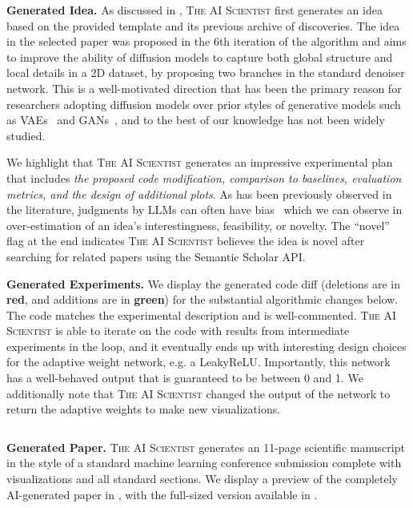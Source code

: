 \documentclass[11pt, a4paper]{include/gdm_format}
\newcommand{\ouralgo}{\textsc{The AI Scientist}\xspace}
\begin{document}
\textbf{Generated Idea.}
As discussed in , \ouralgo first generates an idea based on the provided template and its previous archive of discoveries.
The idea in the selected paper was proposed in the 6th iteration of the algorithm and aims to improve the ability of diffusion models to capture both global structure and local details in a 2D dataset, by proposing two branches in the standard denoiser network.
This is a well-motivated direction that has been the primary reason for researchers adopting diffusion models over prior styles of generative models such as VAEs~\citep{vae} and GANs~\citep{gan}, and to the best of our knowledge has not been widely studied.

We highlight that \ouralgo generates an impressive experimental plan that includes \emph{the proposed code modification, comparison to baselines, evaluation metrics, and the design of additional plots}.
As has been previously observed in the literature, judgments by LLMs can often have bias~\citep{zheng2024judging} which we can observe in over-estimation of an idea's interestingness, feasibility, or novelty.
The ``novel'' flag at the end indicates \ouralgo believes the idea is novel after searching for related papers using the Semantic Scholar API.

\begin{tcolorbox}[breakable,colback=blue!5!white, colframe=blue!75!black, title=Idea - \texttt{adaptive\_dual\_scale\_denoising}]
{\small  }
\end{tcolorbox}

\textbf{Generated Experiments.}
We display the generated code diff (deletions are in \textcolor{BrickRed}{\textbf{red}}, and additions are in \textcolor{OliveGreen}{\textbf{green}}) for the substantial algorithmic changes below.
The code matches the experimental description and is well-commented.
\ouralgo is able to iterate on the code with results from intermediate experiments in the loop, and it eventually ends up with interesting design choices for the adaptive weight network, e.g. a LeakyReLU.
Importantly, this network has a well-behaved output that is guaranteed to be between 0 and 1.
We additionally note that \ouralgo changed the output of the network to return the adaptive weights to make new visualizations.

\inputminted{diff}{case_study_viz/dual_scale.diff}

\textbf{Generated Paper.}
\ouralgo generates an 11-page scientific manuscript in the style of a standard machine learning conference submission complete with visualizations and all standard sections.
We display a preview of the completely AI-generated paper in , with the full-sized version available in .
\end{document}
